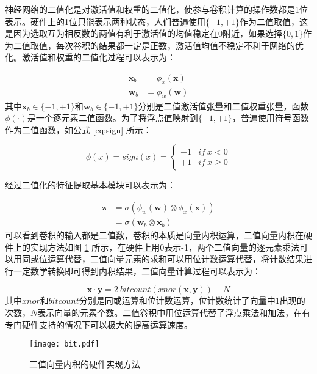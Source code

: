 神经网络的二值化是对激活值和权重的二值化，使参与卷积计算的操作数都是1位表示。硬件上的1位只能表示两种状态，人们普遍使用$\{ -1, +1\}$作为二值取值，这是因为选取互为相反数的两值有利于激活值的均值稳定在0附近，如果选择$\{ 0, 1\}$作为二值取值，每次卷积的结果都一定是正数，激活值均值不稳定不利于网络的优化。激活值和权重的二值化过程可以表示为：

\begin{align}
  \bm{x}_b & = \phi_x(\bm{x}) \\
  \bm{w}_b & = \phi_w(\bm{w})
\end{align}
其中$\bm{x}_b \in \{ -1, +1\}$和$\bm{w}_b \in \{ -1, +1\}$分别是二值激活值张量和二值权重张量，函数$\phi(\cdot)$是一个逐元素二值函数。为了将浮点值映射到$\{ -1, +1\}$，普遍使用符号函数作为二值函数，如公式 \eqref{eq:sign} 所示：

\begin{equation}
  \label{eq:sign}
  \phi(x) = sign(x) =
  \begin{cases}
    -1 & if \ x < 0 \\
    +1 & if \ x \geq 0 
  \end{cases}
\end{equation}

经过二值化的特征提取基本模块可以表示为：

\begin{equation}
  \begin{split}
  \bm{z} & = \sigma (\phi_w(\bm{w}) \otimes \phi_x(\bm{x})) \\
  & = \sigma (\bm{w}_b \otimes \bm{x}_b)
  \end{split}
\end{equation}
可以看到卷积的输入都是二值数，卷积的本质是向量内积运算，二值向量内积在硬件上的实现方法如图 \ref{fig:bit} 所示，在硬件上用0表示-1，两个二值向量的逐元素乘法可以用同或位运算代替，二值向量元素的求和可以用位计数运算代替，将计数结果进行一定数学转换即可得到内积结果，二值向量计算过程可以表示为：

\begin{equation}
  \bm{x} \cdot \bm{y} = 2\ bitcount(xnor(\bm{x}, \bm{y})) - N
\end{equation}
其中$xnor$和$bitcount$分别是同或运算和位计数运算，位计数统计了向量中1出现的次数，$N$表示向量的元素个数。二值卷积中用位运算代替了浮点乘法和加法，在有专门硬件支持的情况下可以极大的提高运算速度。

\begin{figure}[htb]
  \vspace{6pt}
  \centering
  \texttt{[image: bit.pdf]}
  \caption{二值向量内积的硬件实现方法}
  \label{fig:bit}
  \vspace{6pt}
\end{figure}

